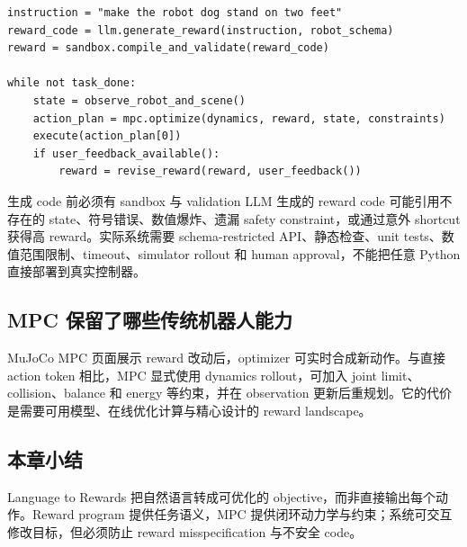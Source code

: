 

\begin{lstlisting}[caption={Reward program 与 MPC 执行循环的概念伪代码}]
instruction = "make the robot dog stand on two feet"
reward_code = llm.generate_reward(instruction, robot_schema)
reward = sandbox.compile_and_validate(reward_code)

while not task_done:
    state = observe_robot_and_scene()
    action_plan = mpc.optimize(dynamics, reward, state, constraints)
    execute(action_plan[0])
    if user_feedback_available():
        reward = revise_reward(reward, user_feedback())
\end{lstlisting}

\begin{warningbox}{生成 code 前必须有 sandbox 与 validation}
LLM 生成的 reward code 可能引用不存在的 state、符号错误、数值爆炸、遗漏 safety constraint，或通过意外 shortcut 获得高 reward。实际系统需要 schema-restricted API、静态检查、unit tests、数值范围限制、timeout、simulator rollout 和 human approval，不能把任意 Python 直接部署到真实控制器。
\end{warningbox}

\subsection{MPC 保留了哪些传统机器人能力}

MuJoCo MPC 页面展示 reward 改动后，optimizer 可实时合成新动作。与直接 action token 相比，MPC 显式使用 dynamics rollout，可加入 joint limit、collision、balance 和 energy 等约束，并在 observation 更新后重规划。它的代价是需要可用模型、在线优化计算与精心设计的 reward landscape。




\subsection{本章小结}

Language to Rewards 把自然语言转成可优化的 objective，而非直接输出每个动作。Reward program 提供任务语义，MPC 提供闭环动力学与约束；系统可交互修改目标，但必须防止 reward misspecification 与不安全 code。

